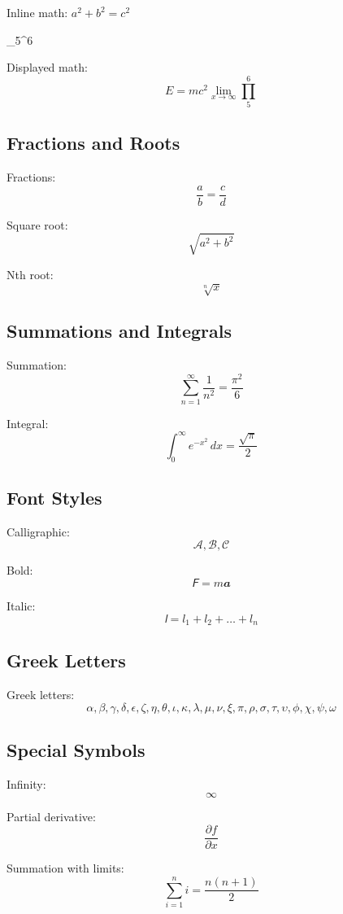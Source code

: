 Inline math: $a^2 + b^2 = c^2$

\oint_{5}^{6}

Displayed math:
\[
E = mc^2
\lim_{x \to \infty}
\prod_{5}^{6}
\]

\subsection*{Fractions and Roots}

Fractions: 
\[
\frac{a}{b} = \frac{c}{d}
\]

Square root: 
\[
\sqrt{a^2 + b^2}
\]

Nth root:
\[
\sqrt[n]{x}
\]

\subsection*{Summations and Integrals}

Summation:
\[
\sum_{n=1}^{\infty} \frac{1}{n^2} = \frac{\pi^2}{6}
\]

Integral:
\[
\int_{0}^{\infty} e^{-x^2} \, dx = \frac{\sqrt{\pi}}{2}
\]

\subsection*{Font Styles}

Calligraphic:
\[
\mathcal{A}, \mathcal{B}, \mathcal{C}
\]

Bold:
\[
\mathsfit{F} = m \mathbfit{a}
\]

Italic:
\[
\mathsfit{l} = l_1 + l_2 + \ldots + l_n
\]

\subsection*{Greek Letters}

Greek letters:
\[
\alpha, \beta, \gamma, \delta, \epsilon, \zeta, \eta, \theta, \iota, \kappa, \lambda, \mu, \nu, \xi, \pi, \rho, \sigma, \tau, \upsilon, \phi, \chi, \psi, \omega
\]

\subsection*{Special Symbols}

Infinity:
\[
\infty
\]

Partial derivative:
\[
\frac{\partial f}{\partial x}
\]

Summation with limits:
\[
\sum_{i=1}^{n} i = \frac{n(n+1)}{2}
\]

